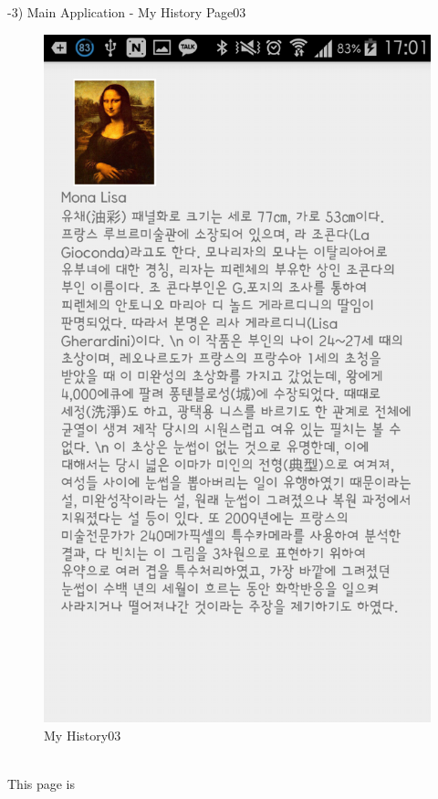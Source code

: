 \documentclass[conference]{IEEEtran}
\begin{document}
-3) Main Application - My History Page03\\
\begin{figure}[htbp]
\begin{center}
    \includegraphics[scale=0.2]{img_capture06}
    \caption{My History03} 
\end{center}
\end{figure}\\
\quad This page is \\\\\\\\
\end{document}
